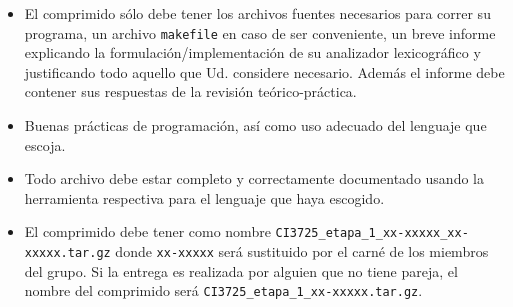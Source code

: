 \documentclass[letterpaper,10pt]{article}
\begin{document}
\begin{itemize}
    \item El comprimido sólo debe tener los archivos fuentes necesarios para correr su programa, un archivo \texttt{makefile} en caso de ser conveniente, un breve informe explicando la formulación/implementación de su analizador lexicográfico y justificando todo aquello que Ud. considere necesario. Además el informe debe contener sus respuestas de la revisión teórico-práctica.
    \item Buenas prácticas de programación, así como uso adecuado del lenguaje que escoja.
    \item Todo archivo debe estar completo y correctamente documentado usando la herramienta respectiva para el lenguaje que haya escogido.
    \item El comprimido debe tener como nombre \texttt{CI3725\_etapa\_1\_xx-xxxxx\_xx-xxxxx.tar.gz} donde
\texttt{xx-xxxxx} será sustituido por el carné de los miembros del grupo. Si la entrega es realizada por alguien que no tiene pareja, el nombre del comprimido será \texttt{CI3725\_etapa\_1\_xx-xxxxx.tar.gz}.
\end{itemize}
\end{document}
